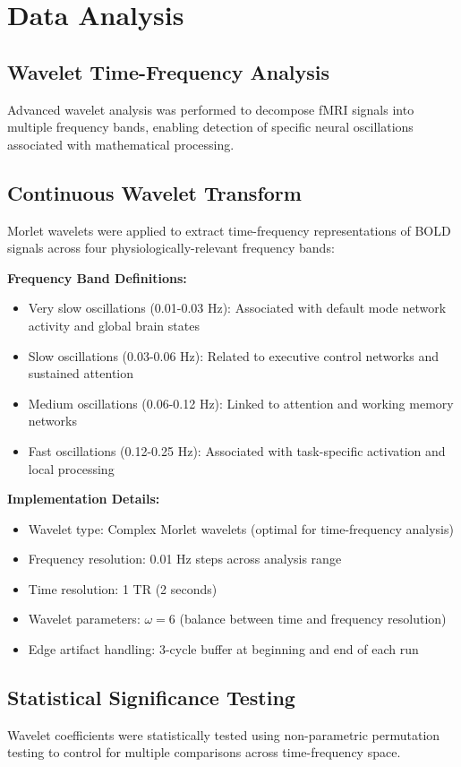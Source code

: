 \section{Data Analysis}
\subsection{Wavelet Time-Frequency Analysis}
Advanced wavelet analysis was performed to decompose fMRI signals into multiple frequency bands, enabling detection of specific neural oscillations associated with mathematical processing.

\subsection{Continuous Wavelet Transform}
Morlet wavelets were applied to extract time-frequency representations of BOLD signals across four physiologically-relevant frequency bands:

\vspace{0.5\baselineskip}
\noindent
\textbf{Frequency Band Definitions:} 
\begin{itemize}
\item Very slow oscillations (0.01-0.03 Hz): Associated with default mode network activity and global brain states
\item Slow oscillations (0.03-0.06 Hz): Related to executive control networks and sustained attention
\item Medium oscillations (0.06-0.12 Hz): Linked to attention and working memory networks
\item Fast oscillations (0.12-0.25 Hz): Associated with task-specific activation and local processing
\end{itemize}

\noindent
\textbf{Implementation Details:}
\begin{itemize}
\item Wavelet type: Complex Morlet wavelets (optimal for time-frequency analysis)
\item Frequency resolution: 0.01 Hz steps across analysis range
\item Time resolution: 1 TR (2 seconds)
\item Wavelet parameters: $\omega = 6$ (balance between time and frequency resolution)
\item Edge artifact handling: 3-cycle buffer at beginning and end of each run
\end{itemize}


\subsection{Statistical Significance Testing}
Wavelet coefficients were statistically tested using non-parametric permutation testing to control for multiple comparisons across time-frequency space.

